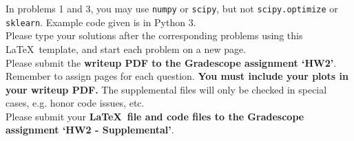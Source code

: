 \documentclass[submit]{harvardml}
\begin{document}
In problems 1 and 3, you may use \texttt{numpy} or \texttt{scipy}, but
not \texttt{scipy.optimize} or \texttt{sklearn}. Example code given is
in Python 3.\\

Please type your solutions after the corresponding problems using this
\LaTeX\ template, and start each problem on a new page.\\

Please submit the \textbf{writeup PDF to the Gradescope assignment `HW2'}. Remember to assign pages for each question.  \textbf{You must include your plots in your writeup PDF. } The supplemental files will only be checked in special cases, e.g. honor code issues, etc. \\

Please submit your \textbf{\LaTeX\ file and code files to the Gradescope assignment `HW2 - Supplemental'}. 
\end{document}
